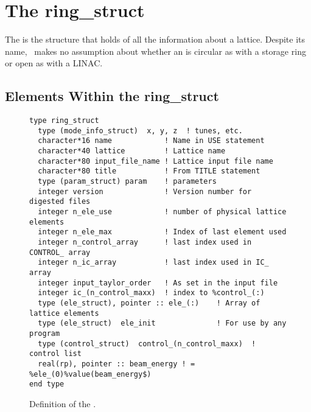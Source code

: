 \chapter{The ring\_struct}
\label{c:ring_struct}

The  is the structure that holds of all the information 
about a lattice.   Despite its name, \bmad\
makes no assumption about whether an  is circular as
with a storage ring or open as with a LINAC.

\section{Elements Within the ring\_struct}
\label {s:ring_ele}

\begin{figure}[htb]
\centering
\begin{verbatim}
type ring_struct
  type (mode_info_struct)  x, y, z  ! tunes, etc.
  character*16 name            ! Name in USE statement
  character*40 lattice         ! Lattice name
  character*80 input_file_name ! Lattice input file name
  character*80 title           ! From TITLE statement
  type (param_struct) param    ! parameters
  integer version              ! Version number for digested files
  integer n_ele_use            ! number of physical lattice elements
  integer n_ele_max            ! Index of last element used
  integer n_control_array      ! last index used in CONTROL_ array
  integer n_ic_array           ! last index used in IC_ array
  integer input_taylor_order   ! As set in the input file
  integer ic_(n_control_maxx)  ! index to %control_(:)
  type (ele_struct), pointer :: ele_(:)    ! Array of lattice elements
  type (ele_struct)  ele_init              ! For use by any program
  type (control_struct)  control_(n_control_maxx)  ! control list
  real(rp), pointer :: beam_energy ! = %ele_(0)%value(beam_energy$)
end type
\end{verbatim}
\caption{Definition of the .}
\label{f:ring_struct}
\end{figure}

